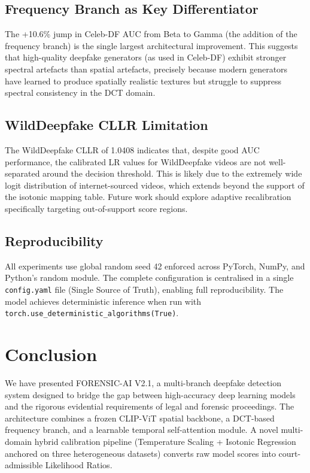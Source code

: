 \documentclass[journal]{IEEEtran}
\begin{document}
\subsection{Frequency Branch as Key Differentiator}
The +10.6\% jump in Celeb-DF AUC from Beta to Gamma (the addition of the frequency branch) is the single largest architectural improvement. This suggests that high-quality deepfake generators (as used in Celeb-DF) exhibit stronger spectral artefacts than spatial artefacts, precisely because modern generators have learned to produce spatially realistic textures but struggle to suppress spectral consistency in the DCT domain.

\subsection{WildDeepfake CLLR Limitation}
The WildDeepfake CLLR of 1.0408 indicates that, despite good AUC performance, the calibrated LR values for WildDeepfake videos are not well-separated around the decision threshold. This is likely due to the extremely wide logit distribution of internet-sourced videos, which extends beyond the support of the isotonic mapping table. Future work should explore adaptive recalibration specifically targeting out-of-support score regions.

\subsection{Reproducibility}
All experiments use global random seed 42 enforced across PyTorch, NumPy, and Python's random module. The complete configuration is centralised in a single \texttt{config.yaml} file (Single Source of Truth), enabling full reproducibility. The model achieves deterministic inference when run with \texttt{torch.use\_deterministic\_algorithms(True)}.

\section{Conclusion}
\label{sec:conclusion}

We have presented FORENSIC-AI V2.1, a multi-branch deepfake detection system designed to bridge the gap between high-accuracy deep learning models and the rigorous evidential requirements of legal and forensic proceedings. The architecture combines a frozen CLIP-ViT spatial backbone, a DCT-based frequency branch, and a learnable temporal self-attention module. A novel multi-domain hybrid calibration pipeline (Temperature Scaling + Isotonic Regression anchored on three heterogeneous datasets) converts raw model scores into court-admissible Likelihood Ratios.
\end{document}
